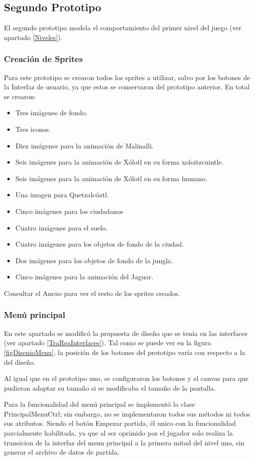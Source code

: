 \subsection{Segundo Prototipo}
El segundo prototipo modela el comportamiento del primer nivel del juego (ver 
apartado \ref{Niveles}). 

\subsubsection{Creación de Sprites}
Para este prototipo se crearon todos los sprites a utilizar, salvo por los botones 
de la Interfaz de usuario, ya que estos se conservaron del prototipo anterior. En 
total se crearon:
\begin{itemize}
	\item Tres imágenes de fondo.
	\item Tres iconos.
	\item Diez imágenes para la animación de Malinalli.
	\item Seis imágenes para la animación de Xólotl en su forma xoloitzcuintle.
	\item Seis imágenes para la animación de Xólotl en su forma humano.
	\item Una imagen para Quetzalcóatl.
	\item Cinco imágenes para los ciudadanos
	\item Cuatro imágenes para el suelo.
	\item Cuatro imágenes para los objetos de fondo de la ciudad.
	\item Dos imágenes para los objetos de fondo de la jungla.
	\item Cinco imágenes para la animación del Jaguar.
\end{itemize}  
Consultar el Anexo para ver el resto de los sprites creados.

\subsubsection{Menú principal}
En este apartado se modificó la propuesta de diseño que se tenía en las interfaces 
(ver apartado \ref{TraReaInterfaces}). Tal como se puede ver en la figura 
\ref{figDisenioMenu}, la posición de los botones del prototipo varía con 
respecto a la del diseño. 
\\
\par
Al igual que en el prototipo uno, se configuraron los botones y el 
canvas para que pudieran adaptar su tamaño si se modificaba el tamaño de la 
pantalla.
\\
\par
Para la funcionalidad del menú principal se implementó la clase PrincipalMenuCtrl; 
sin embargo, no se implementaron todos sus métodos ni todos sus atributos. Siendo 
el botón Empezar partida, él unico con la funcionalidad parcialmente habilitada, 
ya que al ser oprimido por el jugador solo realiza la transicion de la interfaz del 
menu principal a la primera mitad del nivel uno, sin generar el archivo de datos 
de partida.
\\
\par

